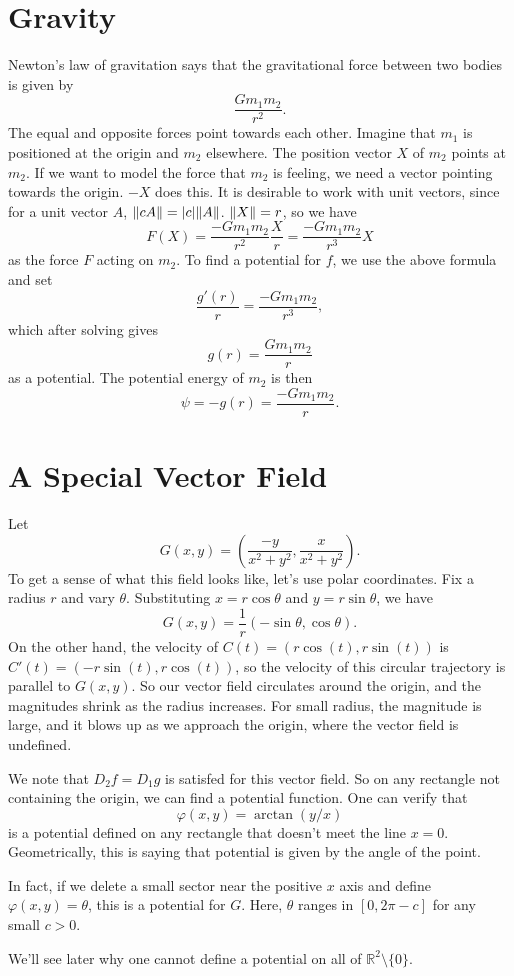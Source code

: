 \documentclass{article}
\begin{document}
\section*{Gravity}

Newton's law of gravitation says that the gravitational 
force between two bodies is given by 
\[\frac{G m_1 m_2}{r^2}.\]
The equal and opposite forces point towards each other.
Imagine that $m_1$ is positioned at the origin and $m_2$ elsewhere.
The position vector $X$ of $m_2$ points at $m_2$. If we want to model
the force that $m_2$ is feeling, we need a vector pointing towards the origin.
$-X$ does this. It is desirable to work with unit vectors, since
for a unit vector $A$, $\norm{cA} = |c| \norm{A}$. $\norm{X} = r$, so we have
\[F(X) = \frac{-G m_1 m_2}{r^2} \frac{X}{r} = \frac{-G m_1 m_2}{r^3}X\]
as the force $F$ acting on $m_2$. To find a potential for $f$, we 
use the above formula and set
\[\frac{g'(r)}{r}= \frac{-G m_1 m_2}{r^3},\]
which after solving gives
\[g(r) = \frac{G m_1 m_2}{r}\]
as a potential. The potential energy of $m_2$ is then
\[ \psi = -g(r) = \frac{-G m_1 m_2}{r}.\]


\section*{A Special Vector Field}
Let 
\[G(x,y) =\left( \frac{-y}{x^2+y^2} , \frac{x}{x^2+y^2}  \right).\]
To get a sense of what this field looks like, let's use polar coordinates. Fix a radius $r$
and vary $\theta$. Substituting $x=r\cos\theta$ and $y=r\sin\theta$, we have
\[G(x,y) = \frac{1}{r} (-\sin \theta, \cos \theta).\]
On the other hand, the velocity of $C(t) = (r\cos(t),r\sin(t))$ is
$C'(t) = (-r\sin(t), r\cos(t))$, so the velocity of this circular trajectory
is parallel to $G(x,y)$. So our vector field circulates around the origin,
and the magnitudes shrink as the radius increases. For small radius,
the magnitude is large, and it blows up as we approach the origin, where the
vector field is undefined.

We note that $D_2 f = D_1 g$ is satisfed for this vector field. So on any rectangle
not containing the origin, we can find a potential function.
One can verify that 
\[\varphi(x,y) = \arctan(y/x)\]
is a potential defined on any rectangle that doesn't meet the line $x=0$.
Geometrically, this is saying that potential is given by the angle of the point.

In fact, if we delete a small sector near the positive $x$ axis and define $\varphi(x,y) = \theta$,
this is a potential for $G$. Here, $\theta$ ranges in $[0,2\pi - c]$
for any small $c>0$.

We'll see later why one cannot define a potential on all
of $\mathbb{R}^2 \setminus \{0\}$.
\end{document}
